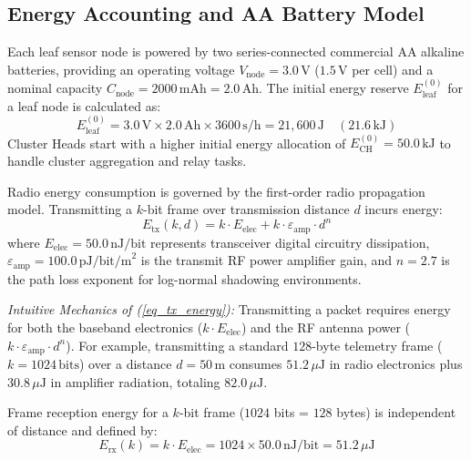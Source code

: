 \documentclass[conference]{IEEEtran}
\begin{document}
\subsection{Energy Accounting and AA Battery Model}
Each leaf sensor node is powered by two series-connected commercial AA alkaline batteries, providing an operating voltage $V_{\text{node}} = 3.0\,\text{V}$ ($1.5\,\text{V}$ per cell) and a nominal capacity $C_{\text{node}} = 2000\,\text{mAh} = 2.0\,\text{Ah}$. The initial energy reserve $E_{\text{leaf}}^{(0)}$ for a leaf node is calculated as:
\begin{equation}
\label{eq_initial_energy}
E_{\text{leaf}}^{(0)} = 3.0\,\text{V} \times 2.0\,\text{Ah} \times 3600\,\text{s/h} = 21,600\,\text{J} \quad (21.6\,\text{kJ})
\end{equation}
Cluster Heads start with a higher initial energy allocation of $E_{\text{CH}}^{(0)} = 50.0\,\text{kJ}$ to handle cluster aggregation and relay tasks.

Radio energy consumption is governed by the first-order radio propagation model. Transmitting a $k$-bit frame over transmission distance $d$ incurs energy:
\begin{equation}
\label{eq_tx_energy}
E_{\text{tx}}(k, d) = k \cdot E_{\text{elec}} + k \cdot \varepsilon_{\text{amp}} \cdot d^n
\end{equation}
where $E_{\text{elec}} = 50.0\,\text{nJ/bit}$ represents transceiver digital circuitry dissipation, $\varepsilon_{\text{amp}} = 100.0\,\text{pJ/bit/m}^2$ is the transmit RF power amplifier gain, and $n = 2.7$ is the path loss exponent for log-normal shadowing environments. 

\textit{Intuitive Mechanics of (\ref{eq_tx_energy}):} Transmitting a packet requires energy for both the baseband electronics ($k \cdot E_{\text{elec}}$) and the RF antenna power ($k \cdot \varepsilon_{\text{amp}} \cdot d^n$). For example, transmitting a standard $128$-byte telemetry frame ($k = 1024\,\text{bits}$) over a distance $d = 50\,\text{m}$ consumes $51.2\,\mu\text{J}$ in radio electronics plus $30.8\,\mu\text{J}$ in amplifier radiation, totaling $82.0\,\mu\text{J}$.

Frame reception energy for a $k$-bit frame ($1024$ bits = $128$ bytes) is independent of distance and defined by:
\begin{equation}
\label{eq_rx_energy}
E_{\text{rx}}(k) = k \cdot E_{\text{elec}} = 1024 \times 50.0\,\text{nJ/bit} = 51.2\,\mu\text{J}
\end{equation}
\end{document}
